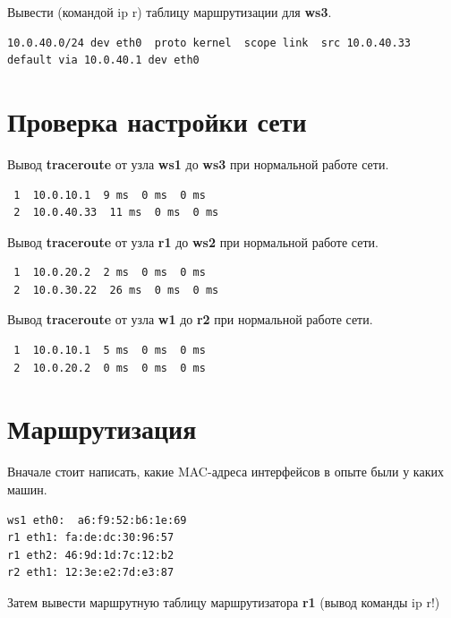 \documentclass[a4paper,12pt]{article}
\begin{document}
Вывести (командой ip r) таблицу маршрутизации для \textbf{ws3}.
\begin{Verbatim}
10.0.40.0/24 dev eth0  proto kernel  scope link  src 10.0.40.33 
default via 10.0.40.1 dev eth0 
\end{Verbatim}




\section{Проверка настройки сети}

Вывод \textbf{traceroute} от узла \textbf{ws1} до \textbf{ws3} при нормальной работе сети.

\begin{Verbatim}
 1  10.0.10.1  9 ms  0 ms  0 ms
 2  10.0.40.33  11 ms  0 ms  0 ms

\end{Verbatim}

Вывод \textbf{traceroute} от узла \textbf{r1} до \textbf{ws2} при нормальной работе сети.

\begin{Verbatim}
 1  10.0.20.2  2 ms  0 ms  0 ms
 2  10.0.30.22  26 ms  0 ms  0 ms

\end{Verbatim}

Вывод \textbf{traceroute} от узла \textbf{w1} до \textbf{r2} при нормальной работе сети.

\begin{Verbatim}
 1  10.0.10.1  5 ms  0 ms  0 ms
 2  10.0.20.2  0 ms  0 ms  0 ms
\end{Verbatim}


\section{Маршрутизация}


Вначале стоит написать, какие MAC-адреса интерфейсов в опыте были у каких машин.
\begin{Verbatim}
ws1 eth0:  a6:f9:52:b6:1e:69 
r1 eth1: fa:de:dc:30:96:57  
r1 eth2: 46:9d:1d:7c:12:b2 
r2 eth1: 12:3e:e2:7d:e3:87
\end{Verbatim}


Затем вывести маршрутную таблицу маршрутизатора \textbf{r1} (вывод команды ip r!)
\end{document}

